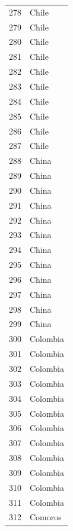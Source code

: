 \documentclass[
  letterpaper,
  DIV=11,
  numbers=noendperiod]{scrreprt}
\begin{document}
\begin{tabular}{ll}
278  &                     Chile \\
279  &                     Chile \\
280  &                     Chile \\
281  &                     Chile \\
282  &                     Chile \\
283  &                     Chile \\
284  &                     Chile \\
285  &                     Chile \\
286  &                     Chile \\
287  &                     Chile \\
288  &                     China \\
289  &                     China \\
290  &                     China \\
291  &                     China \\
292  &                     China \\
293  &                     China \\
294  &                     China \\
295  &                     China \\
296  &                     China \\
297  &                     China \\
298  &                     China \\
299  &                     China \\
300  &                  Colombia \\
301  &                  Colombia \\
302  &                  Colombia \\
303  &                  Colombia \\
304  &                  Colombia \\
305  &                  Colombia \\
306  &                  Colombia \\
307  &                  Colombia \\
308  &                  Colombia \\
309  &                  Colombia \\
310  &                  Colombia \\
311  &                  Colombia \\
312  &                   Comoros \\

\end{tabular}
\end{document}
